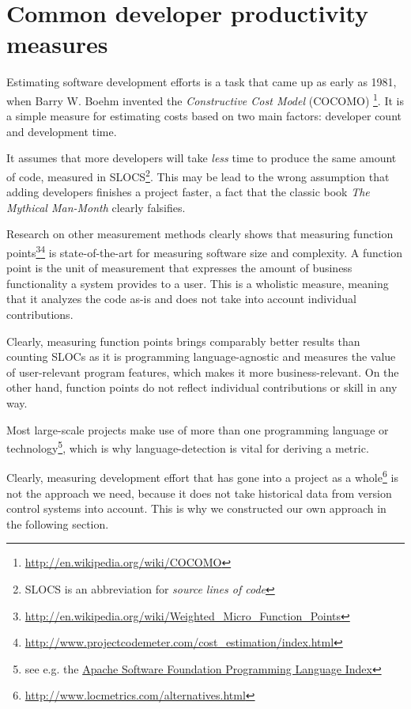 \section{Common developer productivity measures}
Estimating software development efforts is a task that
came up as early as 1981, when Barry W. Boehm invented the \textit{
Constructive Cost Model} (COCOMO)
\footnote{\url{http://en.wikipedia.org/wiki/COCOMO}}.
It is a simple measure for estimating
costs based on two main factors: developer count and development time.
\newline

It assumes that more developers will take \textit{less} time to produce the
same amount of code, measured in SLOCS\footnote{SLOCS is an abbreviation for
\textit{source lines of code}}. This may be lead to the wrong assumption that
adding developers finishes a project faster, a fact that the
classic book \textit{The Mythical Man-Month}\cite{fb:1975} clearly falsifies.
\newline

Research on other measurement methods clearly shows that measuring
function points\footnote{\url{http://en.wikipedia.org/wiki/Weighted_Micro_Function_Points}}\footnote{\url{http://www.projectcodemeter.com/cost_estimation/index.html}}
is state-of-the-art for measuring software size and complexity.
A function point is the unit of measurement that expresses the amount of
business functionality a system provides to a user. This is a wholistic
measure, meaning that it analyzes the code as-is and does not take into
account individual contributions.

Clearly, measuring function points brings comparably better results
than counting SLOCs as it is programming language-agnostic and measures
the value of user-relevant program features, which makes it more
business-relevant.
On the other hand, function points do not reflect individual
contributions or skill in any way.

Most large-scale projects make use of more than one programming language
or technology\footnote{see e.g. the \href{http://projects.apache.org/indexes/language.html}{Apache Software Foundation Programming Language Index}},
which is why language-detection is vital for deriving a metric.
\newline

Clearly, measuring development effort that has gone into a project as a whole\footnote{\url{http://www.locmetrics.com/alternatives.html}}
is not the approach we need, because it does not take historical data from
version control systems  into account. This is why we constructed our own
approach in the following section.

